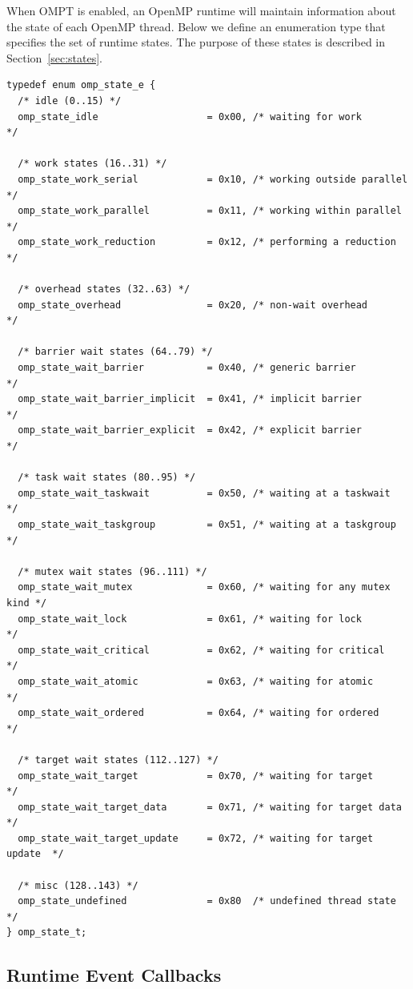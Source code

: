 \documentclass{article}
\begin{document}
When OMPT is enabled, an OpenMP runtime will maintain information about the state of  each OpenMP thread. 
Below we define an enumeration type that specifies the set of runtime states. 
The purpose of these states is described in Section~\ref{sec:states}.

\begin{verbatim}
typedef enum omp_state_e {
  /* idle (0..15) */
  omp_state_idle                   = 0x00, /* waiting for work           */

  /* work states (16..31) */
  omp_state_work_serial            = 0x10, /* working outside parallel   */
  omp_state_work_parallel          = 0x11, /* working within parallel    */
  omp_state_work_reduction         = 0x12, /* performing a reduction     */

  /* overhead states (32..63) */
  omp_state_overhead               = 0x20, /* non-wait overhead          */

  /* barrier wait states (64..79) */
  omp_state_wait_barrier           = 0x40, /* generic barrier            */
  omp_state_wait_barrier_implicit  = 0x41, /* implicit barrier           */
  omp_state_wait_barrier_explicit  = 0x42, /* explicit barrier           */
    
  /* task wait states (80..95) */
  omp_state_wait_taskwait          = 0x50, /* waiting at a taskwait      */
  omp_state_wait_taskgroup         = 0x51, /* waiting at a taskgroup     */

  /* mutex wait states (96..111) */
  omp_state_wait_mutex             = 0x60, /* waiting for any mutex kind */
  omp_state_wait_lock              = 0x61, /* waiting for lock           */
  omp_state_wait_critical          = 0x62, /* waiting for critical       */
  omp_state_wait_atomic            = 0x63, /* waiting for atomic         */
  omp_state_wait_ordered           = 0x64, /* waiting for ordered        */
  
  /* target wait states (112..127) */
  omp_state_wait_target            = 0x70, /* waiting for target         */ 
  omp_state_wait_target_data       = 0x71, /* waiting for target data    */ 
  omp_state_wait_target_update     = 0x72, /* waiting for target update  */ 

  /* misc (128..143) */
  omp_state_undefined              = 0x80  /* undefined thread state     */
} omp_state_t;
\end{verbatim}
\clearpage
\subsection{Runtime Event Callbacks}
\label{appendix:ompt-types:events}
\end{document}
